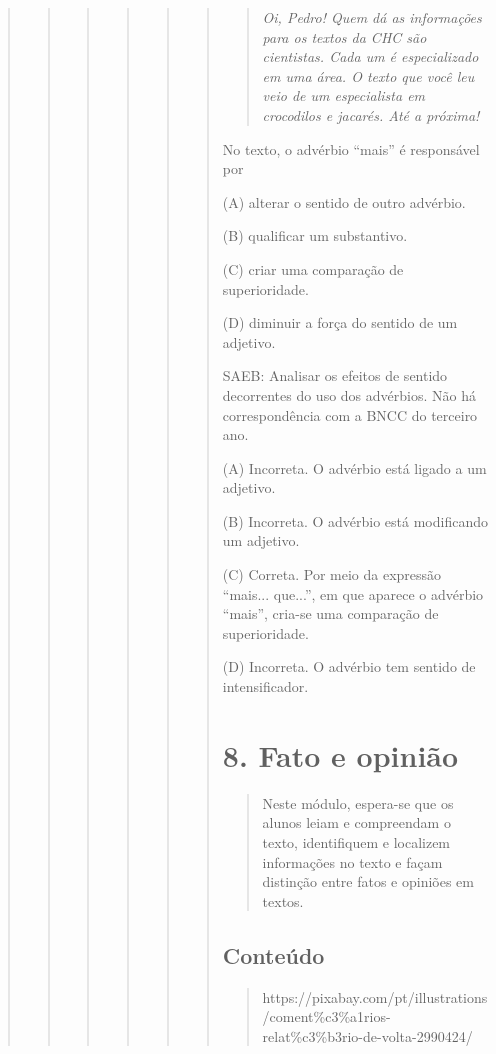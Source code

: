 \begin{quote}
\begin{quote}
\begin{quote}
\begin{quote}
\begin{quote}
\begin{quote}
\begin{quote}
\textit{Oi, Pedro! Quem dá as informações para os textos da CHC são cientistas.
Cada um é especializado em uma área. O texto que você leu veio de um
especialista em crocodilos e jacarés. Até a próxima!}

\end{quote}

No texto, o advérbio ``mais'' é responsável por

(A) alterar o sentido de outro advérbio.

(B) qualificar um substantivo.

(C) criar uma comparação de superioridade.

(D) diminuir a força do sentido de um adjetivo.

SAEB: Analisar os efeitos de sentido decorrentes do uso dos advérbios.
Não há correspondência com a BNCC do terceiro ano.

(A) Incorreta. O advérbio está ligado a um adjetivo.

(B) Incorreta. O advérbio está modificando um adjetivo.

(C) Correta. Por meio da expressão ``mais... que...'', em que aparece o advérbio ``mais'', cria-se uma comparação de superioridade.

(D) Incorreta. O advérbio tem sentido de intensificador.

\section{8. Fato e opinião}\label{muxf3dulo-8}

\begin{quote}
Neste módulo, espera-se que os alunos leiam e compreendam o texto,
identifiquem e localizem informações no texto e façam distinção entre
fatos e opiniões em textos.
\end{quote}

\subsection{Conteúdo}\label{conteuxfado-7}

\begin{quote}
https://pixabay.com/pt/illustrations/coment\%c3\%a1rios-relat\%c3\%b3rio-de-volta-2990424/


\end{quote}
\end{quote}
\end{quote}
\end{quote}
\end{quote}
\end{quote}
\end{quote}
